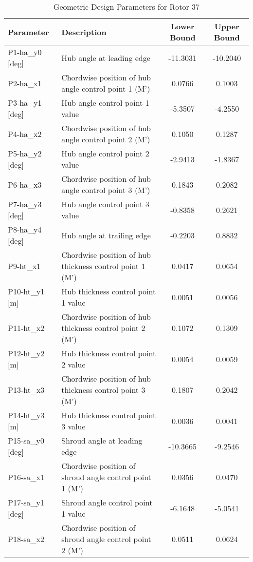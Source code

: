 \documentclass[dscexam, EN]{ufabcFHZh}
\begin{document}
\begin{table}[htbp]
  \centering
  \caption{Geometric Design Parameters for Rotor 37}
  \label{tab:rotor_37_parameters}
  \small %
  \begin{tabular}{|l|l|c|c|}
    \hline
    \textbf{Parameter} & \textbf{Description} & \textbf{Lower Bound} & \textbf{Upper Bound} \\
    \hline
    P1-ha\_y0 [deg] & Hub angle at leading edge & -11.3031 & -10.2040 \\
    P2-ha\_x1 & Chordwise position of hub angle control point 1 (M') & 0.0766 & 0.1003 \\
    P3-ha\_y1 [deg] & Hub angle control point 1 value & -5.3507 & -4.2550 \\
    P4-ha\_x2 & Chordwise position of hub angle control point 2 (M') & 0.1050 & 0.1287 \\
    P5-ha\_y2 [deg] & Hub angle control point 2 value & -2.9413 & -1.8367 \\
    P6-ha\_x3 & Chordwise position of hub angle control point 3 (M') & 0.1843 & 0.2082 \\
    P7-ha\_y3 [deg] & Hub angle control point 3 value & -0.8358 & 0.2621 \\
    P8-ha\_y4 [deg] & Hub angle at trailing edge & -0.2203 & 0.8832 \\
    P9-ht\_x1 & Chordwise position of hub thickness control point 1 (M') & 0.0417 & 0.0654 \\
    P10-ht\_y1 [m] & Hub thickness control point 1 value & 0.0051 & 0.0056 \\
    P11-ht\_x2 & Chordwise position of hub thickness control point 2 (M') & 0.1072 & 0.1309 \\
    P12-ht\_y2 [m] & Hub thickness control point 2 value & 0.0054 & 0.0059 \\
    P13-ht\_x3 & Chordwise position of hub thickness control point 3 (M') & 0.1807 & 0.2042 \\
    P14-ht\_y3 [m] & Hub thickness control point 3 value & 0.0036 & 0.0041 \\
    P15-sa\_y0 [deg] & Shroud angle at leading edge & -10.3665 & -9.2546 \\
    P16-sa\_x1 & Chordwise position of shroud angle control point 1 (M') & 0.0356 & 0.0470 \\
    P17-sa\_y1 [deg] & Shroud angle control point 1 value & -6.1648 & -5.0541 \\
    P18-sa\_x2 & Chordwise position of shroud angle control point 2 (M') & 0.0511 & 0.0624 \\

\end{tabular}
\end{table}
\end{document}
